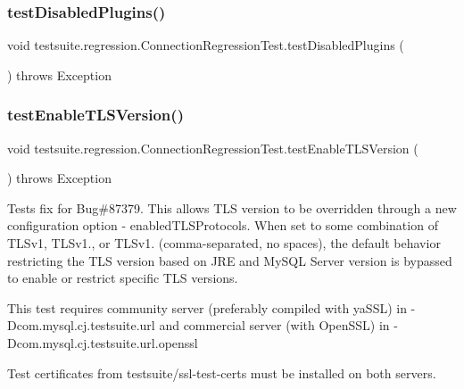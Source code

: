 \subsubsection{\texorpdfstring{test\+Disabled\+Plugins()}{testDisabledPlugins()}}
{\footnotesize\ttfamily void testsuite.\+regression.\+Connection\+Regression\+Test.\+test\+Disabled\+Plugins (\begin{DoxyParamCaption}{ }\end{DoxyParamCaption}) throws Exception}

\mbox{\label{classtestsuite_1_1regression_1_1_connection_regression_test_aaf770f994d6d32e25429a79c91cbc18b}} 
\subsubsection{\texorpdfstring{test\+Enable\+T\+L\+S\+Version()}{testEnableTLSVersion()}}
{\footnotesize\ttfamily void testsuite.\+regression.\+Connection\+Regression\+Test.\+test\+Enable\+T\+L\+S\+Version (\begin{DoxyParamCaption}{ }\end{DoxyParamCaption}) throws Exception}

Tests fix for Bug\#87379. This allows T\+LS version to be overridden through a new configuration option -\/ enabled\+T\+L\+S\+Protocols. When set to some combination of T\+L\+Sv1, T\+L\+Sv1., or T\+L\+Sv1. (comma-\/separated, no spaces), the default behavior restricting the T\+LS version based on J\+RE and My\+S\+QL Server version is bypassed to enable or restrict specific T\+LS versions.

This test requires community server (preferably compiled with ya\+S\+SL) in -\/\+Dcom.\+mysql.\+cj.\+testsuite.\+url and commercial server (with Open\+S\+SL) in -\/\+Dcom.\+mysql.\+cj.\+testsuite.\+url.\+openssl

Test certificates from testsuite/ssl-\/test-\/certs must be installed on both servers. \mbox{\label{classtestsuite_1_1regression_1_1_connection_regression_test_a8e581b7d593b06e2deca5f2498c3de72}} 
